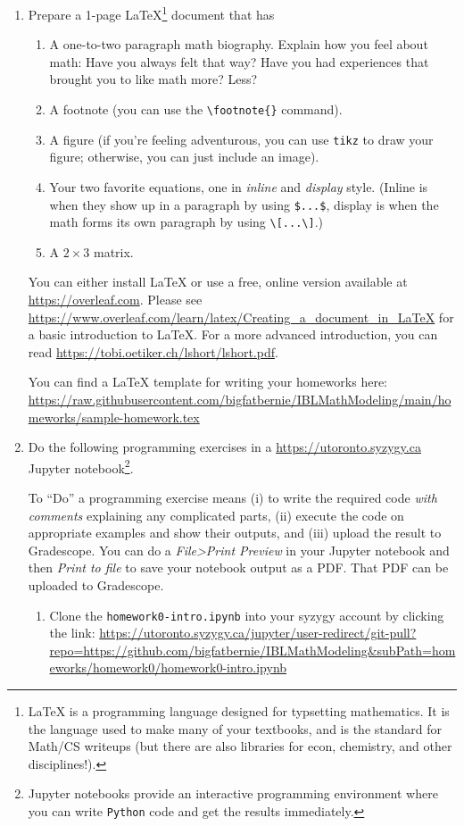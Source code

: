 \documentclass[letter]{article}
\begin{document}
	\begin{enumerate}
		\item Prepare a 1-page \LaTeX{}\footnote{ \LaTeX{} is a programming language designed for typsetting
			mathematics. It is the language used to make many of your textbooks, and is the standard for
			Math/CS writeups (but there are also libraries for econ, chemistry, and other disciplines!).} document that has
		\begin{enumerate}
			\item A one-to-two paragraph math biography. Explain how you feel about math: Have you always felt that way?
				Have you had experiences that brought you to like math more? Less?
			\item A footnote (you can use the \verb|\footnote{}| command).
			\item A figure (if you're feeling adventurous, you can use {\tt tikz} to draw your figure; otherwise,
				you can just include an image).
			\item Your two favorite equations, one in \emph{inline} and \emph{display} style. (Inline is when
				they show up in a paragraph by using \verb|$...$|, display is when the math forms
				its own paragraph by using \verb|\[...\]|.)
			\item A $2\times 3$ matrix.
		\end{enumerate}

		You can either install \LaTeX{} or use a free, online version available at \url{https://overleaf.com}. Please
		see \url{https://www.overleaf.com/learn/latex/Creating_a_document_in_LaTeX} for a basic introduction to \LaTeX{}.
		For a more advanced introduction, you can read \url{https://tobi.oetiker.ch/lshort/lshort.pdf}.

		You can find a \LaTeX{} template for writing your homeworks here: 
		\url{https://raw.githubusercontent.com/bigfatbernie/IBLMathModeling/main/homeworks/sample-homework.tex}



		\item Do the following programming exercises in a \url{https://utoronto.syzygy.ca} Jupyter notebook\footnote{ Jupyter
			notebooks provide an interactive programming environment where you can write {\tt Python} code and get 
			the results immediately.}.

			To ``Do'' a programming exercise means (i) to write the required code \emph{with comments} explaining
			any complicated parts, (ii) execute the code on appropriate examples and show their outputs, and 
			(iii) upload the result to Gradescope. You can do a {\it File>Print Preview} in your Jupyter notebook
			and then {\it Print to file} to save your notebook output as a PDF. That PDF can be uploaded to Gradescope.
		\begin{enumerate}
			\item Clone the {\tt homework0-intro.ipynb} into your syzygy account by clicking the link:
				\url{https://utoronto.syzygy.ca/jupyter/user-redirect/git-pull?repo=https://github.com/bigfatbernie/IBLMathModeling&subPath=homeworks/homework0/homework0-intro.ipynb}


\end{enumerate}
\end{enumerate}
\end{document}
